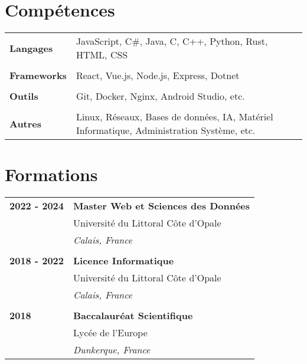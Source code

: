 \documentclass[a4paper, 12pt]{article}
\begin{document}
\begin{minipage}[t]{0.65\textwidth}

    \section*{\textcolor{sectioncolor}{Compétences}}
    \begin{tabular}{ m{} m{} }
        \textbf{Langages} & JavaScript, C\#, Java, C, C++, Python, Rust, HTML, CSS \\
        & \\
        \textbf{Frameworks} & React, Vue.js, Node.js, Express, Dotnet \\
        & \\
        \textbf{Outils} & Git, Docker, Nginx, Android Studio, etc. \\
        & \\
        \textbf{Autres} & Linux, Réseaux, Bases de données, IA, Matériel Informatique, Administration Système, etc. \\
    \end{tabular}

    \vspace{-0.4cm}

    \section*{\textcolor{sectioncolor}{Formations}}
    \begin{tabular}{ m{} m{} }
        \textbf{2022 - 2024} & \textbf{Master Web et Sciences des Données} \\
        & Université du Littoral Côte d'Opale \\
        & \textit{Calais, France} \\
        & \\
        \textbf{2018 - 2022} & \textbf{Licence Informatique} \\
        & Université du Littoral Côte d'Opale \\
        & \textit{Calais, France} \\
        & \\
        \textbf{2018} & \textbf{Baccalauréat Scientifique} \\
        & Lycée de l'Europe \\
        & \textit{Dunkerque, France} \\
    \end{tabular}


\end{minipage}
\end{document}
